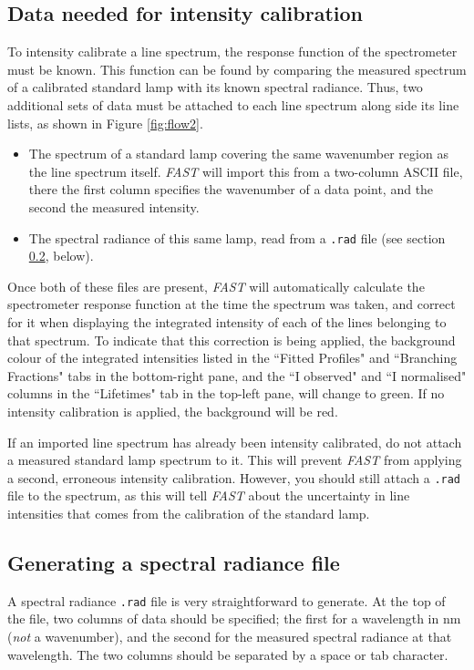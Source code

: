 \documentclass[a4paper,12pt]{report}
\newcommand{\fast}{\emph{FAST} }
\begin{document}
\subsection{Data needed for intensity calibration}
To intensity calibrate a line spectrum, the response function of the spectrometer must be known. This function can be found by comparing the measured spectrum of a calibrated standard lamp with its known spectral radiance. Thus, two additional sets of data must be attached to each line spectrum along side its line lists, as shown in Figure \ref{fig:flow2}.
\begin{itemize}
\item The spectrum of a standard lamp covering the same wavenumber region as the line spectrum itself. \fast will import this from a two-column ASCII file, there the first column specifies the wavenumber of a data point, and the second the measured intensity.
\item The spectral radiance of this same lamp, read from a \verb|.rad| file (see section \ref{section:radfile}, below).
\end{itemize}
Once both of these files are present, \fast will automatically calculate the spectrometer response function at the time the spectrum was taken, and correct for it when displaying the integrated intensity of each of the lines belonging to that spectrum. To indicate that this correction is being applied, the background colour of the integrated intensities listed in the ``Fitted Profiles" and ``Branching Fractions" tabs in the bottom-right pane, and the ``I observed" and ``I normalised" columns in the ``Lifetimes" tab in the top-left pane, will change to \colorbox{int_calibrated}{green}. If no intensity calibration is applied, the background will be \colorbox{int_not_calibrated}{red}.

If an imported line spectrum has already been intensity calibrated, do not attach a measured standard lamp spectrum to it. This will prevent \fast from applying a second, erroneous intensity calibration. However, you should still attach a \verb|.rad| file to the spectrum, as this will tell \fast about the uncertainty in line intensities that comes from the calibration of the standard lamp.

\subsection{Generating a spectral radiance file}
\label{section:radfile}
A spectral radiance \verb|.rad| file is very straightforward to generate. At the top of the file, two columns of data should be specified; the first for a wavelength in nm (\emph{not} a wavenumber), and the second for the measured spectral radiance at that wavelength. The two columns should be separated by a space or tab character.
\end{document}
